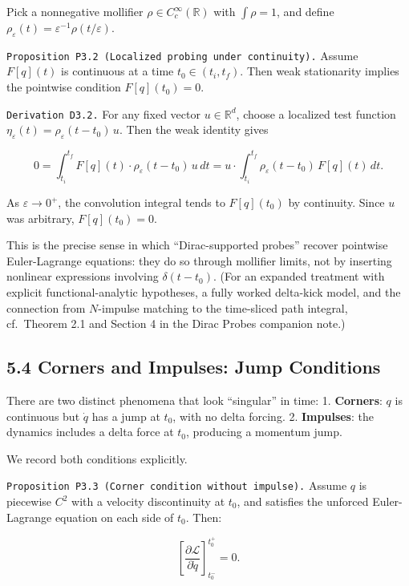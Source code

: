 \documentclass[
]{article}
\begin{document}
Pick a nonnegative mollifier \(\rho\in C_c^\infty(\mathbb R)\) with
\(\int\rho=1\), and define
\(\rho_\varepsilon(t)=\varepsilon^{-1}\rho(t/\varepsilon)\).

\texttt{Proposition\ P3.2\ (Localized\ probing\ under\ continuity).}
Assume \(F[q](t)\) is continuous at a time \(t_0\in(t_i,t_f)\). Then
weak stationarity implies the pointwise condition \(F[q](t_0)=0\).

\texttt{Derivation\ D3.2.} For any fixed vector \(u\in\mathbb R^d\),
choose a localized test function
\(\eta_\varepsilon(t)=\rho_\varepsilon(t-t_0)\,u\). Then the weak
identity gives

\[
0=\int_{t_i}^{t_f} F[q](t)\cdot \rho_\varepsilon(t-t_0)\,u\,dt
=u\cdot\int_{t_i}^{t_f} \rho_\varepsilon(t-t_0)\,F[q](t)\,dt.
\]

As \(\varepsilon\to 0^+\), the convolution integral tends to
\(F[q](t_0)\) by continuity. Since \(u\) was arbitrary, \(F[q](t_0)=0\).

This is the precise sense in which ``Dirac-supported probes'' recover
pointwise Euler-Lagrange equations: they do so through mollifier limits,
not by inserting nonlinear expressions involving \(\delta(t-t_0)\). (For
an expanded treatment with explicit functional-analytic hypotheses, a
fully worked delta-kick model, and the connection from \(N\)-impulse
matching to the time-sliced path integral, cf.~Theorem 2.1 and Section 4
in the Dirac Probes companion note.)

\hypertarget{corners-and-impulses-jump-conditions}{%
\subsection{5.4 Corners and Impulses: Jump
Conditions}\label{corners-and-impulses-jump-conditions}}

There are two distinct phenomena that look ``singular'' in time: 1.
\textbf{Corners}: \(q\) is continuous but \(\dot q\) has a jump at
\(t_0\), with no delta forcing. 2. \textbf{Impulses}: the dynamics
includes a delta force at \(t_0\), producing a momentum jump.

We record both conditions explicitly.

\texttt{Proposition\ P3.3\ (Corner\ condition\ without\ impulse).}
Assume \(q\) is piecewise \(C^2\) with a velocity discontinuity at
\(t_0\), and satisfies the unforced Euler-Lagrange equation on each side
of \(t_0\). Then:

\[
\left[\frac{\partial\mathcal L}{\partial\dot q}\right]_{t_0^-}^{t_0^+}=0.
\]
\end{document}
